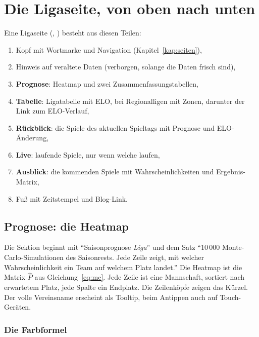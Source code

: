\chapter{Die Ligaseite, von oben nach unten}\label{kap:ligaseite}

Eine Ligaseite (,
) besteht aus diesen Teilen:

\begin{enumerate}
  \item Kopf mit Wortmarke und Navigation (Kapitel~\ref{kap:seiten}),
  \item Hinweis auf veraltete Daten (verborgen, solange die Daten frisch sind),
  \item \textbf{Prognose}: Heatmap und zwei Zusammenfassungstabellen,
  \item \textbf{Tabelle}: Ligatabelle mit ELO, bei Regionalligen mit Zonen,
        darunter der Link zum ELO-Verlauf,
  \item \textbf{Rückblick}: die Spiele des aktuellen Spieltags mit Prognose und
        ELO-Änderung,
  \item \textbf{Live}: laufende Spiele, nur wenn welche laufen,
  \item \textbf{Ausblick}: die kommenden Spiele mit Wahrscheinlichkeiten und
        Ergebnis-Matrix,
  \item Fuß mit Zeitstempel und Blog-Link.
\end{enumerate}


\section{Prognose: die Heatmap}

Die Sektion beginnt mit \enquote{Saisonprognose \emph{Liga}} und dem Satz
\enquote{10\,000 Monte-Carlo-Simulationen des Saisonrests. Jede Zeile zeigt,
mit welcher Wahrscheinlichkeit ein Team auf welchem Platz landet.} Die
Heatmap ist die Matrix $\hat P$ aus Gleichung~\eqref{eq:mc}. Jede Zeile ist
eine Mannschaft, sortiert nach erwartetem Platz, jede Spalte ein Endplatz.
Die Zeilenköpfe zeigen das Kürzel. Der volle Vereinsname erscheint als
Tooltip, beim Antippen auch auf Touch-Geräten.

\subsection*{Die Farbformel}

